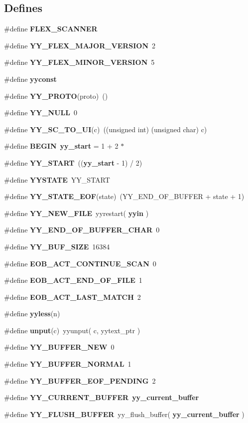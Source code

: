 \subsection*{Defines}
\begin{CompactItemize}
\item 
\#define {\bf FLEX\_\-SCANNER}
\item 
\#define {\bf YY\_\-FLEX\_\-MAJOR\_\-VERSION}\ 2
\item 
\#define {\bf YY\_\-FLEX\_\-MINOR\_\-VERSION}\ 5
\item 
\#define {\bf yyconst}
\item 
\#define {\bf YY\_\-PROTO}(proto)\ ()
\item 
\#define {\bf YY\_\-NULL}\ 0
\item 
\#define {\bf YY\_\-SC\_\-TO\_\-UI}(c)\ ((unsigned int) (unsigned char) c)
\item 
\#define {\bf BEGIN}\ {\bf yy\_\-start} = 1 + 2 $\ast$
\item 
\#define {\bf YY\_\-START}\ (({\bf yy\_\-start} - 1) / 2)
\item 
\#define {\bf YYSTATE}\ YY\_\-START
\item 
\#define {\bf YY\_\-STATE\_\-EOF}(state)\ (YY\_\-END\_\-OF\_\-BUFFER + state + 1)
\item 
\#define {\bf YY\_\-NEW\_\-FILE}\ yyrestart( {\bf yyin} )
\item 
\#define {\bf YY\_\-END\_\-OF\_\-BUFFER\_\-CHAR}\ 0
\item 
\#define {\bf YY\_\-BUF\_\-SIZE}\ 16384
\item 
\#define {\bf EOB\_\-ACT\_\-CONTINUE\_\-SCAN}\ 0
\item 
\#define {\bf EOB\_\-ACT\_\-END\_\-OF\_\-FILE}\ 1
\item 
\#define {\bf EOB\_\-ACT\_\-LAST\_\-MATCH}\ 2
\item 
\#define {\bf yyless}(n)
\item 
\#define {\bf unput}(c)\ yyunput( c, yytext\_\-ptr )
\item 
\#define {\bf YY\_\-BUFFER\_\-NEW}\ 0
\item 
\#define {\bf YY\_\-BUFFER\_\-NORMAL}\ 1
\item 
\#define {\bf YY\_\-BUFFER\_\-EOF\_\-PENDING}\ 2
\item 
\#define {\bf YY\_\-CURRENT\_\-BUFFER}\ {\bf yy\_\-current\_\-buffer}
\item 
\#define {\bf YY\_\-FLUSH\_\-BUFFER}\ yy\_\-flush\_\-buffer( {\bf yy\_\-current\_\-buffer} )
\item 

\end{CompactItemize}
